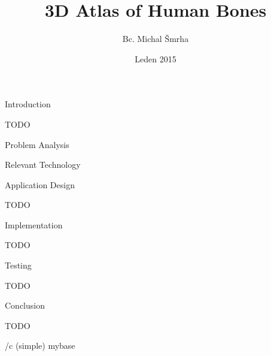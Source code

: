 

\worktype [M/EN]
\title {3D Atlas of Human Bones}
\author {Bc. Michal Šmrha}
\date {Leden 2015}
\makefront

\chap Introduction

TODO

\chap Problem Analysis



\chap Relevant Technology



\chap Application Design

TODO

\chap Implementation

TODO

\chap Testing

TODO

\chap Conclusion

TODO

\bibchap
\usebib/c (simple) mybase

\bye